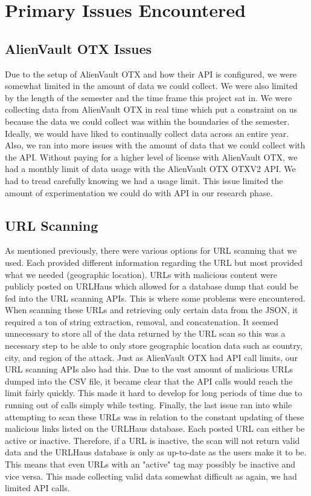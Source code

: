 \documentclass[letterpaper, 10 pt, conference]{ieeeconf}  %
\begin{document}
\section{Primary Issues Encountered}
\subsection*{AlienVault OTX Issues}
Due to the setup of AlienVault OTX and how their API is configured, we were somewhat limited in the amount of data we could collect. We were also limited by the length of the semester and the time frame this project sat in. We were collecting data from AlienVault OTX in real time which put a constraint on us because the data we could collect was within the boundaries of the semester. Ideally, we would have liked to continually collect data across an entire year. Also, we ran into more issues with the amount of data that we could collect with the API. Without paying for a higher level of license with AlienVault OTX, we had a monthly limit of data usage with the AlienVault OTX OTXV2 API. We had to tread carefully knowing we had a usage limit. This issue limited the amount of experimentation we could do with API in our research phase. 
\subsection*{URL Scanning}
As mentioned previously, there were various options for URL scanning that we used. Each provided different information regarding the URL but most provided what we needed (geographic location). URLs with malicious content were publicly posted on URLHaus which allowed for a database dump that could be fed into the URL scanning APIs. This is where some problems were encountered. When scanning these URLs and retrieving only certain data from the JSON, it required a ton of string extraction, removal, and concatenation. It seemed unnecessary to store all of the data returned by the URL scan so this was a necessary step to be able to only store geographic location data such as country, city, and region of the attack. Just as AlienVault OTX had API call limits, our URL scanning APIs also had this. Due to the vast amount of malicious URLs dumped into the CSV file, it became clear that the API calls would reach the limit fairly quickly. This made it hard to develop for long periods of time due to running out of calls simply while testing. Finally, the last issue ran into while attempting to scan these URLs was in relation to the constant updating of these malicious links listed on the URLHaus database. Each posted URL can either be active or inactive. Therefore, if a URL is inactive, the scan will not return valid data and the URLHaus database is only as up-to-date as the users make it to be. This means that even URLs with an "active" tag may possibly be inactive and vice versa. This made collecting valid data somewhat difficult as again, we had limited API calls.
\end{document}
